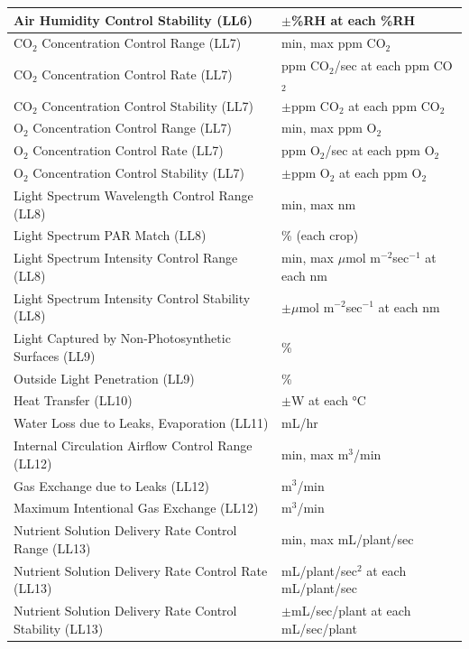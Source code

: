 \documentclass{report}
\newcounter{metricnumber}
\newcommand\rownumber{\stepcounter{metricnumber}\arabic{metricnumber}}
\begin{document}
\begin{center}
\begin{tabular}{| @{\makebox[2em][l]{\rownumber}} | l | l |}
        \hline
        Air Humidity Control Stability \hfill (LL6) & $\pm$\%RH at each \%RH \\
        \hline
        CO${}_2$ Concentration Control Range \hfill (LL7) & min, max ppm CO${}_2$ \\
        \hline
        CO${}_2$ Concentration Control Rate \hfill (LL7) & ppm CO${}_2$/sec at each ppm 
        CO${}_2$ \\
        \hline
        CO${}_2$ Concentration Control Stability \hfill (LL7) & $\pm$ppm CO${}_2$ at 
        each ppm CO${}_2$ \\
        \hline
        O${}_2$ Concentration Control Range \hfill (LL7) & min, max ppm O${}_2$ \\
        \hline
        O${}_2$ Concentration Control Rate \hfill (LL7) & ppm O${}_2$/sec at each ppm 
        O${}_2$  \\
        \hline
        O${}_2$ Concentration Control Stability \hfill (LL7) & $\pm$ppm O${}_2$ at each 
        ppm O${}_2$ \\
        \hline
        Light Spectrum Wavelength Control Range \hfill (LL8) & min, max nm \\
        \hline
        Light Spectrum PAR Match \hfill (LL8) & \% (each crop) \\
        \hline
        Light Spectrum Intensity Control Range \hfill (LL8) & min, max $\mu$mol 
        m${}^{-2}$sec${}^{-1}$ at each nm \\
        \hline
        Light Spectrum Intensity Control Stability \hfill (LL8) & $\pm\mu$mol 
        m${}^{-2}$sec${}^{-1}$ at each nm \\
        \hline
        Light Captured by Non-Photosynthetic Surfaces \hfill (LL9) & \% \\
        \hline
        Outside Light Penetration \hfill (LL9) & \% \\
        \hline
        Heat Transfer \hfill (LL10) & $\pm$W at each °C \\
        \hline
        Water Loss due to Leaks, Evaporation \hfill (LL11) & mL/hr \\
        \hline
        Internal Circulation Airflow Control Range \hfill (LL12) & min, max m${}^3$/min \\
        \hline
        Gas Exchange due to Leaks \hfill (LL12) & m${}^3$/min \\
        \hline
        Maximum Intentional Gas Exchange \hfill (LL12) & m${}^3$/min \\
        \hline
        Nutrient Solution Delivery Rate Control Range \hfill (LL13) & min, max 
        mL/plant/sec \\
        \hline
        Nutrient Solution Delivery Rate Control Rate \hfill (LL13) & mL/plant/sec${}^2$ at each mL/plant/sec  \\
        \hline
        Nutrient Solution Delivery Rate Control Stability \hfill (LL13) & 
        $\pm$mL/sec/plant at each mL/sec/plant \\
        \hline
   \end{tabular}
\end{center}
\newpage
\end{document}
